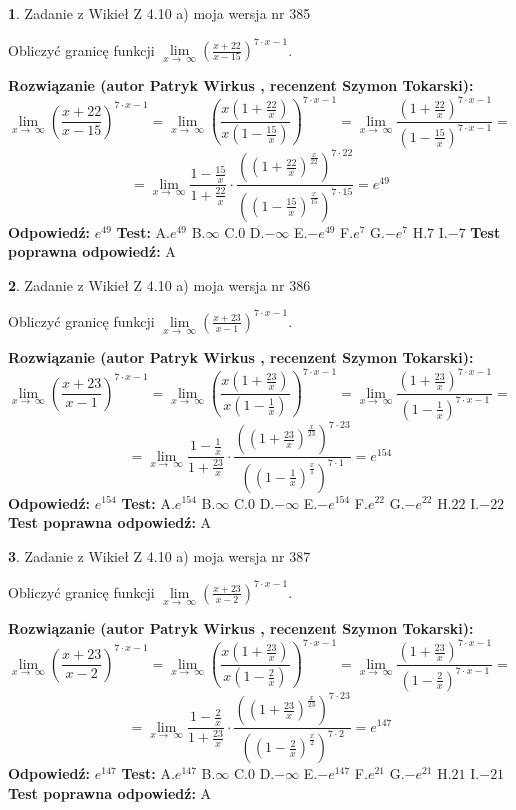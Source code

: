 \documentclass[12pt, a4paper]{article}
\theoremstyle{definition} %
\newtheorem{zad}{}
\newcommand{\zadStart}[1]{\begin{zad}#1\newline}
\newcommand{\zadStop}{\end{zad}}
\newcommand{\rozwStart}[2]{\noindent \textbf{Rozwiązanie (autor #1 , recenzent #2): }\newline}
\newcommand{\rozwStop}{\newline}
\newcommand{\odpStart}{\noindent \textbf{Odpowiedź:}\newline}
\newcommand{\odpStop}{\newline}
\newcommand{\testStart}{\noindent \textbf{Test:}\newline}
\newcommand{\testStop}{\newline}
\newcommand{\kluczStart}{\noindent \textbf{Test poprawna odpowiedź:}\newline}
\newcommand{\kluczStop}{\newline}
\begin{document}
\zadStart{Zadanie z Wikieł Z 4.10 a) moja wersja nr 385}

Obliczyć granicę funkcji  $\lim\limits_{x\to\ \infty}(\frac{x+22}{x-15})^{7\cdot x-1}$.
\zadStop
\rozwStart{Patryk Wirkus}{Szymon Tokarski}
$$\lim\limits_{x\to\ \infty}(\frac{x+22}{x-15})^{7\cdot x-1} = \lim\limits_{x\to\ \infty}(\frac{x(1+\frac{22}{x})}{x(1-\frac{15}{x})})^{7\cdot x-1}=\lim\limits_{x\to\ \infty}\frac{(1+\frac{22}{x})^{7\cdot x-1}}{(1-\frac{15}{x})^{7\cdot x-1}}=$$
$$=\lim\limits_{x\to\ \infty}\frac{1-\frac{15}{x}}{1+\frac{22}{x}}\cdot\frac{((1+\frac{22}{x})^{\frac{x}{22}})^{7\cdot22}}{((1-\frac{15}{x})^{\frac{x}{15}})^{7\cdot15}}=e^{49}$$
\rozwStop
\odpStart
$e^{49}$
\odpStop
\testStart
A.$e^{49}$ B.$\infty$ C.$0$ D.$-\infty$ E.$-e^{49}$
F.$e^{7}$ G.$-e^{7}$
H.$7$
I.$-7$
\testStop
\kluczStart
A
\kluczStop



\zadStart{Zadanie z Wikieł Z 4.10 a) moja wersja nr 386}

Obliczyć granicę funkcji  $\lim\limits_{x\to\ \infty}(\frac{x+23}{x-1})^{7\cdot x-1}$.
\zadStop
\rozwStart{Patryk Wirkus}{Szymon Tokarski}
$$\lim\limits_{x\to\ \infty}(\frac{x+23}{x-1})^{7\cdot x-1} = \lim\limits_{x\to\ \infty}(\frac{x(1+\frac{23}{x})}{x(1-\frac{1}{x})})^{7\cdot x-1}=\lim\limits_{x\to\ \infty}\frac{(1+\frac{23}{x})^{7\cdot x-1}}{(1-\frac{1}{x})^{7\cdot x-1}}=$$
$$=\lim\limits_{x\to\ \infty}\frac{1-\frac{1}{x}}{1+\frac{23}{x}}\cdot\frac{((1+\frac{23}{x})^{\frac{x}{23}})^{7\cdot23}}{((1-\frac{1}{x})^{\frac{x}{1}})^{7\cdot1}}=e^{154}$$
\rozwStop
\odpStart
$e^{154}$
\odpStop
\testStart
A.$e^{154}$ B.$\infty$ C.$0$ D.$-\infty$ E.$-e^{154}$
F.$e^{22}$ G.$-e^{22}$
H.$22$
I.$-22$
\testStop
\kluczStart
A
\kluczStop



\zadStart{Zadanie z Wikieł Z 4.10 a) moja wersja nr 387}

Obliczyć granicę funkcji  $\lim\limits_{x\to\ \infty}(\frac{x+23}{x-2})^{7\cdot x-1}$.
\zadStop
\rozwStart{Patryk Wirkus}{Szymon Tokarski}
$$\lim\limits_{x\to\ \infty}(\frac{x+23}{x-2})^{7\cdot x-1} = \lim\limits_{x\to\ \infty}(\frac{x(1+\frac{23}{x})}{x(1-\frac{2}{x})})^{7\cdot x-1}=\lim\limits_{x\to\ \infty}\frac{(1+\frac{23}{x})^{7\cdot x-1}}{(1-\frac{2}{x})^{7\cdot x-1}}=$$
$$=\lim\limits_{x\to\ \infty}\frac{1-\frac{2}{x}}{1+\frac{23}{x}}\cdot\frac{((1+\frac{23}{x})^{\frac{x}{23}})^{7\cdot23}}{((1-\frac{2}{x})^{\frac{x}{2}})^{7\cdot2}}=e^{147}$$
\rozwStop
\odpStart
$e^{147}$
\odpStop
\testStart
A.$e^{147}$ B.$\infty$ C.$0$ D.$-\infty$ E.$-e^{147}$
F.$e^{21}$ G.$-e^{21}$
H.$21$
I.$-21$
\testStop
\kluczStart
A
\kluczStop
\end{document}
